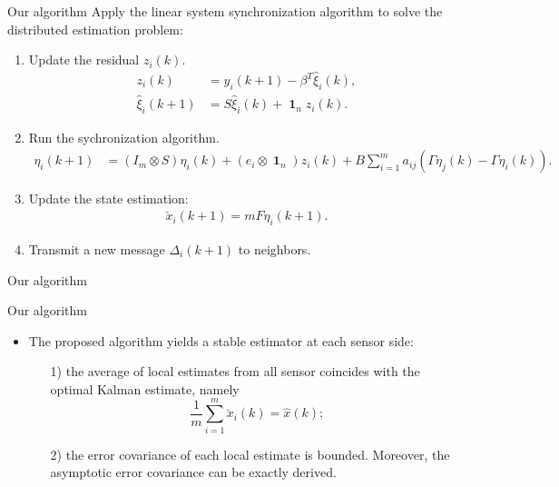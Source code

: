 \documentclass[10pt]{beamer}
\DeclareMathOperator{\1}{\textbf{1}}
\begin{document}
	  \begin{frame}{Our algorithm}
	    Apply the linear system synchronization algorithm to solve the distributed estimation problem:
	    \begin{enumerate}
	      \item \textcolor{thupurple}{Update the residual} $z_i(k)$.
		\begin{align*}
		  z_i(k)&=y_i(k+1)-\beta^T\hat\xi_i(k),\\
		  \hat\xi_i(k+1)&=S\hat\xi_i(k)+\1_nz_i(k).
		\end{align*}
	      \item Run the \textcolor{thupurple}{sychronization} algorithm.
		\begin{align*}
		  \eta_i(k+1)&=(I_m\otimes S)\eta_i(k) +(e_i\otimes\1_n)z_i(k)+
		  B\sum_{i=1}^m a_{ij}(\Gamma \eta_j(k)-\Gamma \eta_i(k)).
		\end{align*}
	      \item Update the state estimation:
		\begin{align*}
		  \breve x_i(k+1)=mF\eta_i(k+1).
		\end{align*}
	      \item Transmit a new message $\Delta_i(k+1)$ to neighbors.
	    \end{enumerate}
	  \end{frame}

	  \begin{frame}{Our algorithm}
	    \begin{figure}
	      \centering
	      \resizebox{0.63\textwidth}{!}{}
	    \end{figure}
	  \end{frame}

	  \begin{frame}{Our algorithm}
	    \begin{itemize}
	      \item The proposed algorithm yields a \textcolor{thupurple}{stable estimator} at each sensor side:
		\begin{enumerate}
		  \item[1)] the average of local estimates from all sensor coincides with the optimal Kalman estimate, namely
		    \begin{equation}
		      \frac{1}{m}\sum_{i=1}^m \breve{x}_i(k)=\hat{x}(k);
		    \end{equation}
		  \item[2)] the error covariance of each local estimate is bounded. Moreover, the asymptotic error covariance can be exactly derived.
		\end{enumerate} 
	    \end{itemize}
	  \end{frame}
\end{document}
